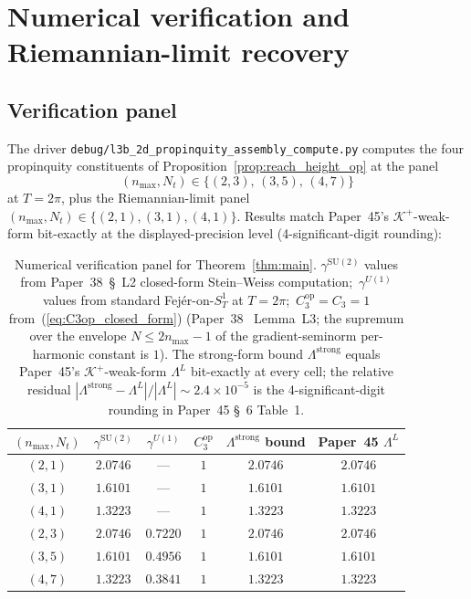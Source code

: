 \documentclass[11pt,a4paper]{article}
\theoremstyle{plain}
\theoremstyle{definition}
\newcommand{\nmax}{n_{\max}}
\newcommand{\Nt}{N_{t}}
\newcommand{\SoneT}{S^{1}_{T}}
\newcommand{\Krein}{\mathcal{K}}
\newcommand{\SU}{\mathrm{SU}}
\newcommand{\Uone}{U(1)}
\newcommand{\Lprop}{\Lambda^{\mathrm{strong}}}
\newcommand{\Lpropweak}{\Lambda^{L}}
\newcommand{\gammaSU}{\gamma^{\SU(2)}}
\newcommand{\gammaU}{\gamma^{\Uone}}
\newcommand{\Cthreeop}{C_{3}^{\mathrm{op}}}
\newcommand{\Kplus}{\Krein^{+}}
\begin{document}
\section{Numerical verification and Riemannian-limit recovery}
\label{sec:numerical}

\subsection{Verification panel}\label{sec:panel}

The driver \texttt{debug/l3b\_2d\_propinquity\_assembly\_compute.py}
computes the four propinquity constituents of
Proposition~\ref{prop:reach_height_op} at the panel
\begin{equation*}
   (\nmax, \Nt) \in \{(2, 3),\, (3, 5),\, (4, 7)\}
\end{equation*}
at $T = 2\pi$, plus the Riemannian-limit panel
$(\nmax, \Nt) \in \{(2, 1), (3, 1), (4, 1)\}$. Results match Paper~45's
$\Kplus$-weak-form bit-exactly at the displayed-precision level (4-significant-digit
rounding):

\begin{table}[t]
\centering
\renewcommand{\arraystretch}{1.2}
\begin{tabular}{c|c|c|c|c|c}
\toprule
$(\nmax, \Nt)$ & $\gammaSU$ & $\gammaU$ & $\Cthreeop$ & $\Lprop$ bound & Paper~45 $\Lpropweak$ \\
\midrule
$(2, 1)$ & $2.0746$ & --- & $1$ & $\mathbf{2.0746}$ & $2.0746$ \\
$(3, 1)$ & $1.6101$ & --- & $1$ & $\mathbf{1.6101}$ & $1.6101$ \\
$(4, 1)$ & $1.3223$ & --- & $1$ & $\mathbf{1.3223}$ & $1.3223$ \\
$(2, 3)$ & $2.0746$ & $0.7220$ & $1$ & $\mathbf{2.0746}$ & $2.0746$ \\
$(3, 5)$ & $1.6101$ & $0.4956$ & $1$ & $\mathbf{1.6101}$ & $1.6101$ \\
$(4, 7)$ & $1.3223$ & $0.3841$ & $1$ & $\mathbf{1.3223}$ & $1.3223$ \\
\bottomrule
\end{tabular}
\caption{Numerical verification panel for Theorem~\ref{thm:main}.
$\gammaSU$ values from Paper~38~\S~L2 closed-form Stein--Weiss
computation;\ $\gammaU$ values from standard Fej\'er-on-$\SoneT$ at
$T = 2\pi$;\ $\Cthreeop = C_{3} = 1$ from~(\ref{eq:C3op_closed_form})
(Paper~38~\cite{paper38} Lemma~L3; the supremum over the envelope
$N \le 2\nmax - 1$ of the gradient-seminorm per-harmonic constant is $1$).
The strong-form bound $\Lprop$ equals
Paper~45's $\Kplus$-weak-form $\Lpropweak$ bit-exactly at every cell;
the relative residual $|\Lprop - \Lpropweak| / |\Lpropweak| \sim
2.4 \times 10^{-5}$ is the 4-significant-digit rounding in Paper~45
\S~6 Table~1.}\label{tab:panel}
\end{table}
\end{document}
